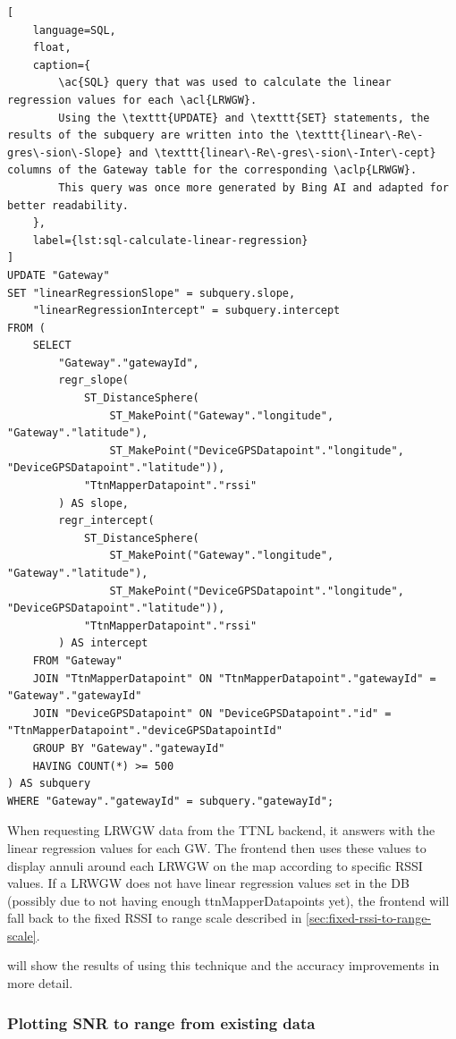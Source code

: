 \begin{lstlisting}[
    language=SQL,
    float,
    caption={
        \ac{SQL} query that was used to calculate the linear regression values for each \acl{LRWGW}.
        Using the \texttt{UPDATE} and \texttt{SET} statements, the results of the subquery are written into the \texttt{linear\-Re\-gres\-sion\-Slope} and \texttt{linear\-Re\-gres\-sion\-Inter\-cept} columns of the Gateway table for the corresponding \aclp{LRWGW}.
        This query was once more generated by Bing AI and adapted for better readability.
    },
    label={lst:sql-calculate-linear-regression}
]
UPDATE "Gateway"
SET "linearRegressionSlope" = subquery.slope,
    "linearRegressionIntercept" = subquery.intercept
FROM (
    SELECT
        "Gateway"."gatewayId",
        regr_slope(
            ST_DistanceSphere(
                ST_MakePoint("Gateway"."longitude", "Gateway"."latitude"),
                ST_MakePoint("DeviceGPSDatapoint"."longitude", "DeviceGPSDatapoint"."latitude")),
            "TtnMapperDatapoint"."rssi"
        ) AS slope,
        regr_intercept(
            ST_DistanceSphere(
                ST_MakePoint("Gateway"."longitude", "Gateway"."latitude"),
                ST_MakePoint("DeviceGPSDatapoint"."longitude", "DeviceGPSDatapoint"."latitude")),
            "TtnMapperDatapoint"."rssi"
        ) AS intercept
    FROM "Gateway"
    JOIN "TtnMapperDatapoint" ON "TtnMapperDatapoint"."gatewayId" = "Gateway"."gatewayId"
    JOIN "DeviceGPSDatapoint" ON "DeviceGPSDatapoint"."id" = "TtnMapperDatapoint"."deviceGPSDatapointId"
    GROUP BY "Gateway"."gatewayId"
    HAVING COUNT(*) >= 500
) AS subquery
WHERE "Gateway"."gatewayId" = subquery."gatewayId";
\end{lstlisting}

When requesting \acl{LRWGW} data from the \ac{TTNL} backend, it answers with the linear regression values for each \acl{GW}.
The frontend then uses these values to display annuli around each \acl{LRWGW} on the map according to specific \ac{RSSI} values.
If a \acl{LRWGW} does not have linear regression values set in the \ac{DB} (possibly due to not having enough ttnMapperDatapoints yet), the frontend will fall back to the fixed \ac{RSSI} to range scale described in \cref{sec:fixed-rssi-to-range-scale}.

 will show the results of using this technique and the accuracy improvements in more detail.

\subsubsection{Plotting \acs{SNR} to range from existing data}\label{sec:plotting-snr-to-range-from-existing-data}

